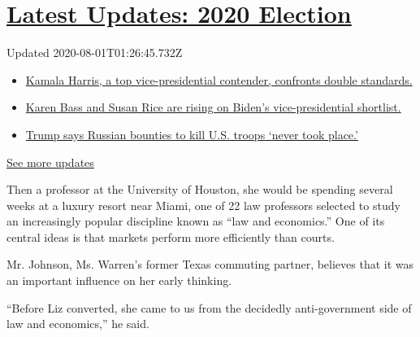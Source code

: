 \hypertarget{latest-updates-2020-election}{%
\section{\texorpdfstring{\href{https://www.nytimes3xbfgragh.onion/2020/07/31/us/elections/biden-vs-trump.html?action=click\&pgtype=Article\&state=default\&region=MAIN_CONTENT_1\&context=storylines_live_updates}{Latest
Updates: 2020
Election}}{Latest Updates: 2020 Election}}\label{latest-updates-2020-election}}

Updated 2020-08-01T01:26:45.732Z

\begin{itemize}
\tightlist
\item
  \href{https://www.nytimes3xbfgragh.onion/2020/07/31/us/elections/biden-vs-trump.html?action=click\&pgtype=Article\&state=default\&region=MAIN_CONTENT_1\&context=storylines_live_updates\#link-29fdff45}{Kamala
  Harris, a top vice-presidential contender, confronts double
  standards.}
\item
  \href{https://www.nytimes3xbfgragh.onion/2020/07/31/us/elections/biden-vs-trump.html?action=click\&pgtype=Article\&state=default\&region=MAIN_CONTENT_1\&context=storylines_live_updates\#link-13ec3d9c}{Karen
  Bass and Susan Rice are rising on Biden's vice-presidential
  shortlist.}
\item
  \href{https://www.nytimes3xbfgragh.onion/2020/07/31/us/elections/biden-vs-trump.html?action=click\&pgtype=Article\&state=default\&region=MAIN_CONTENT_1\&context=storylines_live_updates\#link-49e9a016}{Trump
  says Russian bounties to kill U.S. troops `never took place.'}
\end{itemize}

\href{https://www.nytimes3xbfgragh.onion/2020/07/31/us/elections/biden-vs-trump.html?action=click\&pgtype=Article\&state=default\&region=MAIN_CONTENT_1\&context=storylines_live_updates}{See
more updates}

Then a professor at the University of Houston, she would be spending
several weeks at a luxury resort near Miami, one of 22 law professors
selected to study an increasingly popular discipline known as ``law and
economics.'' One of its central ideas is that markets perform more
efficiently than courts.

Mr. Johnson, Ms. Warren's former Texas commuting partner, believes that
it was an important influence on her early thinking.

``Before Liz converted, she came to us from the decidedly
anti-government side of law and economics,'' he said.

